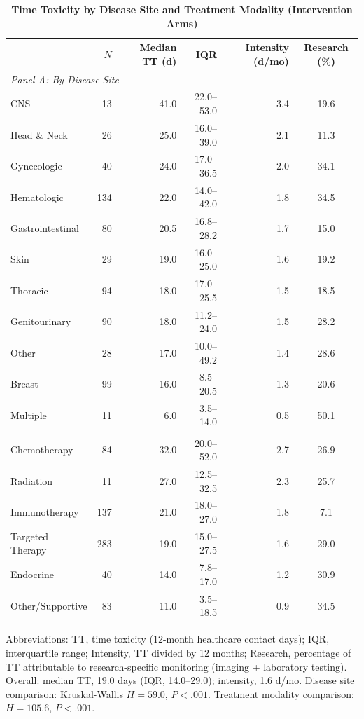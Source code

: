 \documentclass[12pt]{article}
\begin{document}
\begin{table}[htbp]
\centering
\caption{\textbf{Time Toxicity by Disease Site and Treatment Modality (Intervention Arms)}}
\label{tab:tt_subgroups}
\small
\begin{tabular}{@{}lrrrrc@{}}
\toprule
& $N$ & Median TT (d) & IQR & Intensity (d/mo) & Research (\%) \\
\midrule
\multicolumn{6}{l}{\textit{Panel A: By Disease Site}} \\
\addlinespace
CNS & 13 & 41.0 & 22.0--53.0 & 3.4 & 19.6 \\
Head \& Neck & 26 & 25.0 & 16.0--39.0 & 2.1 & 11.3 \\
Gynecologic & 40 & 24.0 & 17.0--36.5 & 2.0 & 34.1 \\
Hematologic & 134 & 22.0 & 14.0--42.0 & 1.8 & 34.5 \\
Gastrointestinal & 80 & 20.5 & 16.8--28.2 & 1.7 & 15.0 \\
Skin & 29 & 19.0 & 16.0--25.0 & 1.6 & 19.2 \\
Thoracic & 94 & 18.0 & 17.0--25.5 & 1.5 & 18.5 \\
Genitourinary & 90 & 18.0 & 11.2--24.0 & 1.5 & 28.2 \\
Other & 28 & 17.0 & 10.0--49.2 & 1.4 & 28.6 \\
Breast & 99 & 16.0 & 8.5--20.5 & 1.3 & 20.6 \\
Multiple & 11 & 6.0 & 3.5--14.0 & 0.5 & 50.1 \\
\addlinespace
\multicolumn{6}{l}{\textit{Panel B: By Treatment Modality}} \\
\addlinespace
Chemotherapy & 84 & 32.0 & 20.0--52.0 & 2.7 & 26.9 \\
Radiation & 11 & 27.0 & 12.5--32.5 & 2.3 & 25.7 \\
Immunotherapy & 137 & 21.0 & 18.0--27.0 & 1.8 & 7.1 \\
Targeted Therapy & 283 & 19.0 & 15.0--27.5 & 1.6 & 29.0 \\
Endocrine & 40 & 14.0 & 7.8--17.0 & 1.2 & 30.9 \\
Other/Supportive & 83 & 11.0 & 3.5--18.5 & 0.9 & 34.5 \\
\bottomrule
\end{tabular}

\vspace{4pt}
\footnotesize
\noindent Abbreviations: TT, time toxicity (12-month healthcare contact days); IQR, interquartile range; Intensity, TT divided by 12 months; Research, percentage of TT attributable to research-specific monitoring (imaging + laboratory testing).\\
Overall: median TT, 19.0 days (IQR, 14.0--29.0); intensity, 1.6 d/mo. Disease site comparison: Kruskal-Wallis $H = 59.0$, $P < .001$. Treatment modality comparison: $H = 105.6$, $P < .001$.
\end{table}
\end{document}
